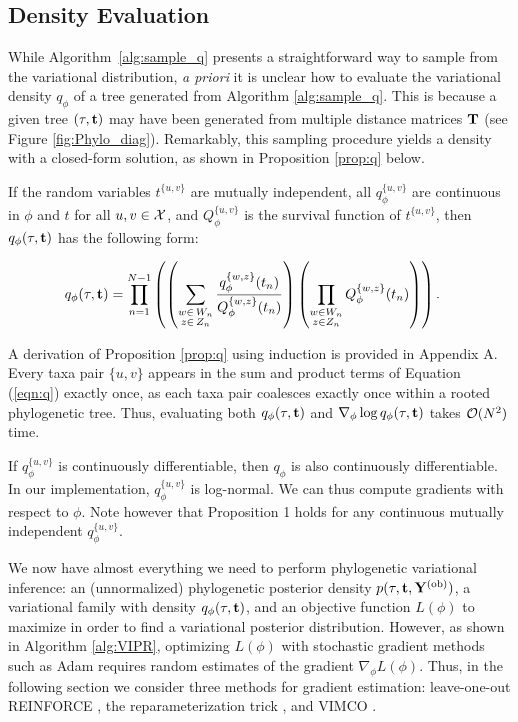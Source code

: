 \subsection{Density Evaluation}

While Algorithm~\ref{alg:sample_q} presents a straightforward way to sample from the variational distribution, \emph{a priori} it is unclear how to evaluate the variational density $q_\phi$ of a tree generated from Algorithm \ref{alg:sample_q}. This is because a given tree $(\tau,\mathbf{t})$ may have been generated from multiple distance matrices $\mathbf{T}$ (see Figure \ref{fig:Phylo_diag}). Remarkably, this sampling procedure yields a density with a closed-form solution, as shown in Proposition \ref{prop:q} below. 

\begin{proposition}\label{prop:q}

If the random variables $t^{\{u,v\}}$ are mutually independent, all $q_{\phi}^{\{u,v\}}$ are continuous in $\phi$ and $t$ for all $u,v \in \mathcal{X}$, and $Q_{\phi}^{\{u,v\}}$ is the survival function of $t^{\{u,v\}}$, then $q_\phi(\tau,\mathbf{t})$ has the following form:

\begin{align}
    q_\phi(\tau,\mathbf{t}) = \prod_{n=1}^{N-1}&\left(\left(\sum_{\substack{w \in\, W_n\\ z \in\, Z_n}} \frac{q_\phi^{\{w,z\}}(t_n)}{Q_\phi^{\{w,z\}}(t_n)}\right)\left(\prod_{\substack{w \in W_n \\ z \in Z_n}} Q_\phi^{\{w,z\}}(t_n)\right)\right).
    \label{eqn:q}
\end{align}
\end{proposition}

A derivation of Proposition \ref{prop:q} using induction is provided in Appendix A. Every taxa pair $\{u,v\}$ appears in the sum and product terms of Equation (\ref{eqn:q}) exactly once, as each taxa pair coalesces exactly once within a rooted phylogenetic tree. Thus, evaluating both $q_\phi(\tau,\mathbf{t})$ and $\nabla_\phi \log q_\phi(\tau,\mathbf{t})$ takes $\mathcal{O}(N^2)$ time.

If $q_\phi^{\{u,v\}}$ is continuously differentiable, then $q_\phi$ is also continuously differentiable. In our \model implementation, $q_\phi^{\{u,v\}}$ is log-normal. We can thus compute gradients with respect to $\phi$. Note however that Proposition 1 holds for any continuous mutually independent $q_\phi^{\{u,v\}}$.

We now have almost everything we need to perform phylogenetic variational inference: an (unnormalized) phylogenetic posterior density $p(\tau,\mathbf{t},\mathbf{Y}^{{(\text{ob})}})$, a variational family with density $q_\phi(\tau,\mathbf{t})$, and an objective function $L(\phi)$ to maximize in order to find a variational posterior distribution. However, as shown in Algorithm \ref{alg:VIPR}, optimizing $L(\phi)$ with stochastic gradient methods such as Adam \citep{Robbins:1951, Kingma:2014a} requires random estimates of the gradient $\nabla_{\phi} L(\phi)$. Thus, in the following section we consider three methods for gradient estimation: leave-one-out REINFORCE \citep{Mnih:2014,Shi:2022}, the reparameterization trick \citep{Kingma:2014}, and VIMCO \citep{Mnih:2016}.

